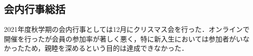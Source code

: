 \subsection*{会内行事総括}

2021年度秋学期の会内行事としては12月にクリスマス会を行った．オンラインで開催を行ったが会員の参加率が著しく悪く，特に新入生においては参加者がいなかったため，親睦を深めるという目的は達成できなかった．

